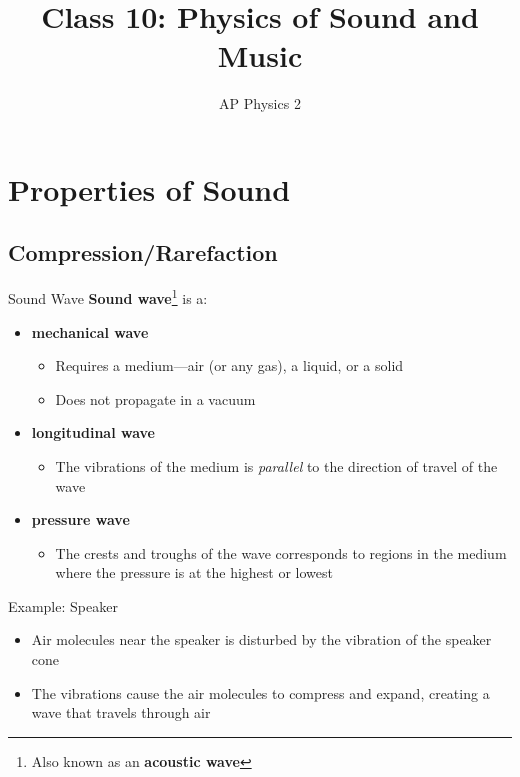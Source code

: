 \documentclass[12pt,compress,aspectratio=169]{beamer}
\title{Class 10: Physics of Sound and Music}
\subtitle{AP Physics 2}
\begin{document}
\begin{frame}
  \titlepage
\end{frame}



\section[Properties]{Properties of Sound}

\subsection{Compression/Rarefaction}

\begin{frame}{Sound Wave}
  \textbf{Sound wave}\footnote{Also known as an \textbf{acoustic wave}} is a:
  \begin{itemize}
  \item \textbf{mechanical wave}
    \begin{itemize}
    \item Requires a medium---air (or any gas), a liquid, or a solid
    \item Does not propagate in a vacuum
    \end{itemize}
  \item \textbf{longitudinal wave}
    \begin{itemize}
    \item The vibrations of the medium is \emph{parallel} to the direction of
      travel of the wave
    \end{itemize}
  \item \textbf{pressure wave}
    \begin{itemize}
    \item The crests and troughs of the wave corresponds to regions in the
      medium where the pressure is at the highest or lowest
    \end{itemize}
  \end{itemize}
\end{frame}



\begin{frame}{Example: Speaker}
  \begin{itemize}
  \item Air molecules near the speaker is disturbed by the vibration of the
    speaker cone
  \item The vibrations cause the air molecules to compress and
    expand, creating a wave that travels through air
  \end{itemize}
  \begin{center}
  \end{center}
\end{frame}
\end{document}
